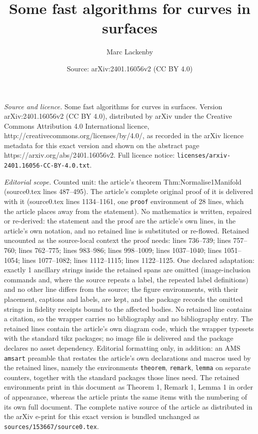 \documentclass[10pt,a4paper]{amsart}
\title{Some fast algorithms for curves in surfaces}
\author{Marc Lackenby}
\date{Source: arXiv:2401.16056v2 (CC BY 4.0)}
\begin{document}
\maketitle

\noindent\emph{Source and licence.} Some fast algorithms for curves in surfaces. Version arXiv:2401.16056v2 (CC BY 4.0), distributed by arXiv under the Creative Commons Attribution 4.0 International licence, http://creativecommons.org/licenses/by/4.0/, as recorded in the arXiv licence metadata for this exact version and shown on the abstract page https://arxiv.org/abs/2401.16056v2. Full licence notice: \texttt{licenses/arxiv-2401.16056-CC-BY-4.0.txt}.\par\smallskip

\noindent\textit{Editorial scope.} Counted unit: the article's theorem Thm:Normalise1Manifold (source0.tex lines 487--495). The article's complete original proof of it is delivered with it (source0.tex lines 1134--1161, one \texttt{proof} environment of 28 lines, which the article places away from the statement). No mathematics is written, repaired or re-derived: the statement and the proof are the article's own lines, in the article's own notation, and no retained line is substituted or re-flowed.  Retained uncounted as the source-local context the proof needs: lines 736--739; lines 757--760; lines 762--775; lines 983--986; lines 998--1009; lines 1037--1040; lines 1051--1054; lines 1077--1082; lines 1112--1115; lines 1122--1125.  One declared adaptation: exactly 1 ancillary strings inside the retained spans are omitted (image-inclusion commands and, where the source repeats a label, the repeated label definitions) and no other line differs from the source; the figure environments, with their placement, captions and labels, are kept, and the package records the omitted strings in fidelity receipts bound to the affected bodies.  No retained line contains a citation, so the wrapper carries no bibliography and no bibliography entry.  The retained lines contain the article's own diagram code, which the wrapper typesets with the standard tikz packages; no image file is delivered and the package declares no asset dependency.  Editorial formatting only, in addition: an AMS \texttt{amsart} preamble that restates the article's own declarations and macros used by the retained lines, namely the environments \texttt{theorem}, \texttt{remark}, \texttt{lemma} on separate counters, together with the standard packages those lines need.  The retained environments print in this document as Theorem 1, Remark 1, Lemma 1 in order of appearance, whereas the article prints the same items with the numbering of its own full document.  The complete native source of the article as distributed in the arXiv e-print for this exact version is bundled unchanged as \texttt{sources/153667/source0.tex}.
\end{document}
